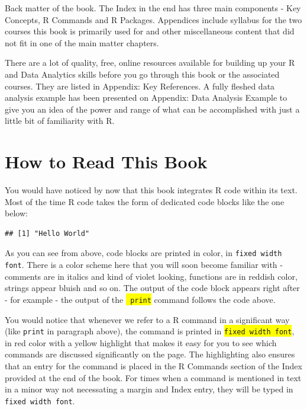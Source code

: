 \documentclass[11pt, letterpaper, twoside]{memoir}\usepackage{knitr}
\newcommand\rcommand[1]{
\colorbox{yellow}{\texttt{\color{red} #1}}
\index{R Commands!#1}
}
\begin{document}
Back matter of the book. The Index in the end has three main components - Key Concepts, R Commands and R Packages. Appendices include syllabus for the two courses this book is primarily used for and other miscellaneous content that did not fit in one of the main matter chapters.

There are a lot of quality, free, online resources available for building up your R and Data Analytics skills before you go through this book or the associated courses. They are listed in Appendix: Key References. A fully fleshed data analysis example has been presented on Appendix: Data Analysis Example to give you an idea of the power and range of what can be accomplished with just a little bit of familiarity with R.

\section*{How to Read This Book}

You would have noticed by now that this book integrates R code within its text. Most of the time R code takes the form of dedicated code blocks like the one below:  

\begin{knitrout}
\color{fgcolor}\begin{kframe}
\begin{alltt}
\hlstd{(}\hlstd{)}
\end{alltt}
\begin{verbatim}
## [1] "Hello World"
\end{verbatim}
\end{kframe}
\end{knitrout}

As you can see from above, code blocks are printed in color, in \texttt{fixed width font}. There is a color scheme here that you will soon become familiar with - comments are in italics and kind of violet looking, functions are in reddish color, strings appear bluish and so on. The output of the code block appears right after - for example - the output of the \rcommand{print} command follows the code above.

You would notice that whenever we refer to a R command in a significant way (like \texttt{print} in paragraph above), the command is printed in \colorbox{yellow}{\texttt{fixed width font}}, in red color with a yellow highlight that makes it easy for you to see which commands are discussed significantly on the page. The highlighting also ensures that an entry for the command is placed in the R Commands section of the Index provided at the end of the book. For times when a command is mentioned in text in a minor way not necessating a margin and Index entry, they will be typed in \texttt{fixed width font}.
\end{document}
